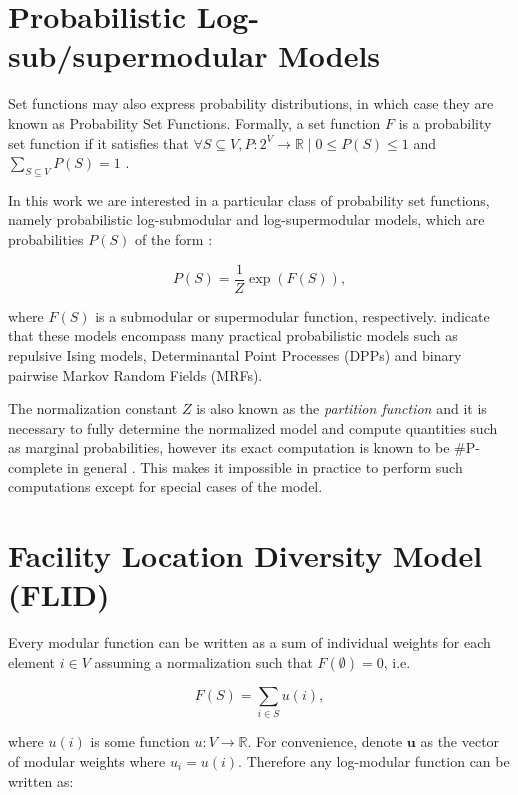 \section{Probabilistic Log-sub/supermodular Models}

Set functions may also express probability distributions, in which case they are known as Probability Set Functions. Formally, a set function $F$ is a probability set function if it satisfies that  $\forall S \subseteq V, P: 2^V \rightarrow \mathbb{R} \mid 0 \leq P(S) \leq 1$ and $\sum_{S \subseteq V} P(S) = 1$ \citep{bruno99sets}.

In this work we are interested in a particular class of probability set functions, namely probabilistic log-submodular and log-supermodular models, which are probabilities $P(S)$ of the form \citep{djolonga14variational}:

\begin{equation}
  P(S) = \frac{1}{Z}\exp(F(S)),
\end{equation}

where $F(S)$ is a submodular or supermodular function, respectively. \citet{djolonga14variational, djolonga15scalable} indicate that these models encompass many practical probabilistic models such as repulsive Ising models, Determinantal Point Processes (DPPs) and binary pairwise Markov Random Fields (MRFs).

The normalization constant $Z$ is also known as the \textit{partition function} and it is necessary to fully determine the normalized model and compute quantities such as marginal probabilities, however its exact computation is known to be \#P-complete in general \citep{jerrum1990}. This makes it impossible in practice to perform such computations except for special cases of the model.

\section{Facility Location Diversity Model (FLID)}

Every modular function can be written as a sum of individual weights for each element $i \in V$ assuming a normalization such that $F(\emptyset) = 0$, i.e.

\begin{equation}
  F(S) = \sum_{i \in S} u(i),
\end{equation}

where $u(i)$ is some function $u: V \rightarrow \mathbb{R}$. For convenience, denote $\mathbf{u}$ as the vector of modular weights where $u_{i} = u(i)$. Therefore any log-modular function can be written as:

